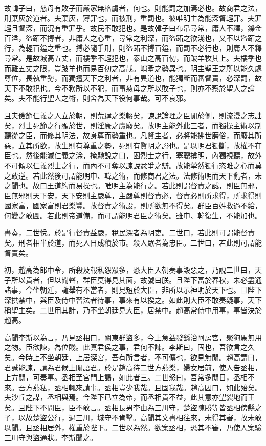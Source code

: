 故韓子曰，慈母有敗子而嚴家無格虜者，何也。則能罰之加焉必也。故商君之法，刑棄灰於道者。夫棄灰，薄罪也，而被刑，重罰也。彼唯明主為能深督輕罪。夫罪輕且督深，而況有重罪乎。故民不敢犯也。是故韓子曰布帛尋常，庸人不釋，鑠金百溢，盜跖不搏者，非庸人之心重，尋常之利深，而盜跖之欲淺也，又不以盜跖之行，為輕百鎰之重也。搏必隨手刑，則盜跖不搏百鎰，而罰不必行也，則庸人不釋尋常。是故城高五丈，而樓季不輕犯也，泰山之高百仞，而跛羊牧其上。夫樓季也而難五丈之限，豈跛羊也而易百仞之高哉。峭塹之勢異也。明主聖王之所以能久處尊位，長執重勢，而獨擅天下之利者，非有異道也，能獨斷而審督責，必深罰，故天下不敢犯也。今不務所以不犯，而事慈母之所以敗子也，則亦不察於聖人之論矣。夫不能行聖人之術，則舍為天下役何事哉。可不哀邪。

且夫儉節仁義之人立於朝，則荒肆之樂輟矣，諫說論理之臣閒於側，則流漫之志詘矣，烈士死節之行顯於世，則淫康之虞廢矣。故明主能外此三者，而獨操主術以制聽從之臣，而修其明法，故身尊而勢重也。凡賢主者，必將能拂世磨俗，而廢其所惡，立其所欲，故生則有尊重之勢，死則有賢明之謚也。是以明君獨斷，故權不在臣也。然後能滅仁義之涂，掩馳說之口，困烈士之行，塞聰揜明，內獨視聽，故外不可傾以仁義烈士之行，而內不可奪以諫說忿爭之辯。故能犖然獨行恣睢之心而莫之敢逆。若此然後可謂能明申、韓之術，而修商君之法。法修術明而天下亂者，未之聞也。故曰王道約而易操也。唯明主為能行之。若此則謂督責之誠，則臣無邪，臣無邪則天下安，天下安則主嚴尊，主嚴尊則督責必，督責必則所求得，所求得則國家富，國家富則君樂豐。故督責之術設，則所欲無不得矣。群臣百姓救過不給，何變之敢圖。若此則帝道備，而可謂能明君臣之術矣。雖申、韓復生，不能加也。

書奏，二世悅。於是行督責益嚴，稅民深者為明吏。二世曰，若此則可謂能督責矣。刑者相半於道，而死人日成積於市。殺人眾者為忠臣。二世曰，若此則可謂能督責矣。

初，趙高為郎中令，所殺及報私怨眾多，恐大臣入朝奏事毀惡之，乃說二世曰，天子所以貴者，但以聞聲，群臣莫得見其面，故號曰朕。且陛下富於春秋，未必盡通諸事，今坐朝廷，譴舉有不當者，則見短於大臣，非所以示神明於天下也。且陛下深拱禁中，與臣及侍中習法者待事，事來有以揆之。如此則大臣不敢奏疑事，天下稱聖主矣。二世用其計，乃不坐朝廷見大臣，居禁中。趙高常侍中用事，事皆決於趙高。

高聞李斯以為言，乃見丞相曰，關東群盜多，今上急益發繇治阿房宮，聚狗馬無用之物。臣欲諫，為位賤。此真君侯之事，君何不諫。李斯曰，固也，吾欲言之久矣。今時上不坐朝廷，上居深宮，吾有所言者，不可傳也，欲見無閒。趙高謂曰，君誠能諫，請為君候上閒語君。於是趙高待二世方燕樂，婦女居前，使人告丞相，上方閒，可奏事。丞相至宮門上謁，如此者三。二世怒曰，吾常多閒日，丞相不來。吾方燕私，丞相輒來請事。丞相豈少我哉。且固我哉。趙高因曰，如此殆矣。夫沙丘之謀，丞相與焉。今陛下已立為帝，而丞相貴不益，此其意亦望裂地而王矣。且陛下不問臣，臣不敢言。丞相長男李由為三川守，楚盜陳勝等皆丞相傍縣之子，以故楚盜公行，過三川，城守不肯擊。高聞其文書相往來，未得其審，故未敢以聞。且丞相居外，權重於陛下。二世以為然。欲案丞相，恐其不審，乃使人案驗三川守與盜通狀。李斯聞之。

